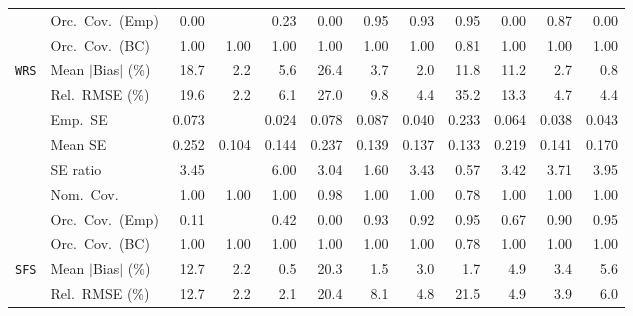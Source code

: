 \begin{landscape}
\begin{longtable}{llrrrrrrrrrr}
 & Orc.\ Cov.\ (Emp) & 0.00 &  & 0.23 & 0.00 & \cellcolor{rankone}0.95 & \cellcolor{ranktwo}0.93 & \cellcolor{rankone}0.95 & 0.00 & \cellcolor{rankthree}0.87 & 0.00 \\
 & Orc.\ Cov.\ (BC) & \cellcolor{rankone}1.00 & \cellcolor{rankone}1.00 & \cellcolor{rankone}1.00 & \cellcolor{rankone}1.00 & \cellcolor{rankone}1.00 & \cellcolor{rankone}1.00 & \cellcolor{ranktwo}0.81 & \cellcolor{rankone}1.00 & \cellcolor{rankone}1.00 & \cellcolor{rankone}1.00 \\
\addlinespace[2pt]
\quad \texttt{WRS} & Mean $|$Bias$|$ (\%) & 18.7 & \cellcolor{rankthree}2.2 & 5.6 & 26.4 & 3.7 & \cellcolor{ranktwo}2.0 & 11.8 & 11.2 & 2.7 & \cellcolor{rankone}0.8 \\
 & Rel.\ RMSE (\%) & 19.6 & \cellcolor{rankone}2.2 & 6.1 & 27.0 & 9.8 & \cellcolor{ranktwo}4.4 & 35.2 & 13.3 & \cellcolor{rankthree}4.7 & \cellcolor{ranktwo}4.4 \\
 & Emp.\ SE & 0.073 &  & 0.024 & 0.078 & 0.087 & 0.040 & 0.233 & 0.064 & 0.038 & 0.043 \\
 & Mean SE & 0.252 & 0.104 & 0.144 & 0.237 & 0.139 & 0.137 & 0.133 & 0.219 & 0.141 & 0.170 \\
 & SE ratio & 3.45 &  & 6.00 & \cellcolor{rankthree}3.04 & \cellcolor{ranktwo}1.60 & 3.43 & \cellcolor{rankone}0.57 & 3.42 & 3.71 & 3.95 \\
 & Nom.\ Cov. & \cellcolor{ranktwo}1.00 & \cellcolor{ranktwo}1.00 & \cellcolor{ranktwo}1.00 & \cellcolor{rankone}0.98 & \cellcolor{ranktwo}1.00 & \cellcolor{ranktwo}1.00 & \cellcolor{rankthree}0.78 & \cellcolor{ranktwo}1.00 & \cellcolor{ranktwo}1.00 & \cellcolor{ranktwo}1.00 \\
 & Orc.\ Cov.\ (Emp) & 0.11 &  & 0.42 & 0.00 & \cellcolor{ranktwo}0.93 & \cellcolor{rankthree}0.92 & \cellcolor{rankone}0.95 & 0.67 & 0.90 & \cellcolor{rankone}0.95 \\
 & Orc.\ Cov.\ (BC) & \cellcolor{rankone}1.00 & \cellcolor{rankone}1.00 & \cellcolor{rankone}1.00 & \cellcolor{rankone}1.00 & \cellcolor{rankone}1.00 & \cellcolor{rankone}1.00 & \cellcolor{ranktwo}0.78 & \cellcolor{rankone}1.00 & \cellcolor{rankone}1.00 & \cellcolor{rankone}1.00 \\
\addlinespace[2pt]
\quad \texttt{SFS} & Mean $|$Bias$|$ (\%) & 12.7 & 2.2 & \cellcolor{rankone}0.5 & 20.3 & \cellcolor{ranktwo}1.5 & 3.0 & \cellcolor{rankthree}1.7 & 4.9 & 3.4 & 5.6 \\
 & Rel.\ RMSE (\%) & 12.7 & \cellcolor{ranktwo}2.2 & \cellcolor{rankone}2.1 & 20.4 & 8.1 & 4.8 & 21.5 & 4.9 & \cellcolor{rankthree}3.9 & 6.0 \\

\end{longtable}
\end{landscape}
